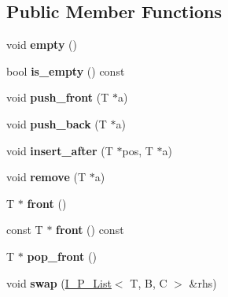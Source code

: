 \subsection*{Public Member Functions}
\begin{DoxyCompactItemize}
\item 
\mbox{\label{classI__P__List_a5f4fbaeab44e1436e8df8f2610fea678}} 
void {\bfseries empty} ()
\item 
\mbox{\label{classI__P__List_a22a71e7dd5d0909f6b2a6169f23f405a}} 
bool {\bfseries is\+\_\+empty} () const
\item 
\mbox{\label{classI__P__List_ab451ae17d3c708fadf0116b51b8e439a}} 
void {\bfseries push\+\_\+front} (T $\ast$a)
\item 
\mbox{\label{classI__P__List_a272ef1f06f96654d234bd20a5119cf49}} 
void {\bfseries push\+\_\+back} (T $\ast$a)
\item 
\mbox{\label{classI__P__List_aa9ac155c5df78d23a49e2306b6c7c6bf}} 
void {\bfseries insert\+\_\+after} (T $\ast$pos, T $\ast$a)
\item 
\mbox{\label{classI__P__List_a0c6eedba26db69c88b1c01076227e6ed}} 
void {\bfseries remove} (T $\ast$a)
\item 
\mbox{\label{classI__P__List_acdc9bccf1fb441ac53599521bf698d7f}} 
T $\ast$ {\bfseries front} ()
\item 
\mbox{\label{classI__P__List_a63e1213b0d91a19f312119369f647c84}} 
const T $\ast$ {\bfseries front} () const
\item 
\mbox{\label{classI__P__List_aa89b6c67922c032e910ba821ab13a482}} 
T $\ast$ {\bfseries pop\+\_\+front} ()
\item 
\mbox{\label{classI__P__List_a35249b861d1cbc540b26ffb4b4de572f}} 
void {\bfseries swap} (\mbox{\hyperlink{classI__P__List}{I\+\_\+\+P\+\_\+\+List}}$<$ T, B, C $>$ \&rhs)
\end{DoxyCompactItemize}
